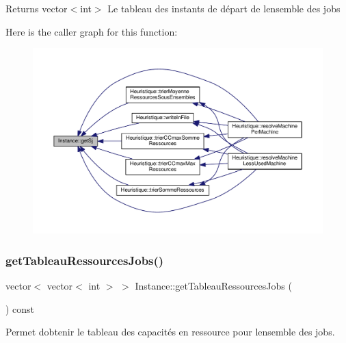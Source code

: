 \begin{DoxyReturn}{Returns}
vector$<$int$>$ Le tableau des instants de départ de l\textquotesingle{}ensemble des jobs 
\end{DoxyReturn}
Here is the caller graph for this function\+:\nopagebreak
\begin{figure}[H]
\begin{center}
\leavevmode
\includegraphics[width=350pt]{classInstance_a2c11032145489a3a90d3b9f1e3dfd2d4_icgraph}
\end{center}
\end{figure}
\mbox{\label{classInstance_a98460018fa91a213ce7c1fe83a318641}} 
\subsubsection{\texorpdfstring{get\+Tableau\+Ressources\+Jobs()}{getTableauRessourcesJobs()}}
{\footnotesize\ttfamily vector$<$ vector$<$ int $>$ $>$ Instance\+::get\+Tableau\+Ressources\+Jobs (\begin{DoxyParamCaption}{ }\end{DoxyParamCaption}) const}



Permet d\textquotesingle{}obtenir le tableau des capacités en ressource pour l\textquotesingle{}ensemble des jobs. 

